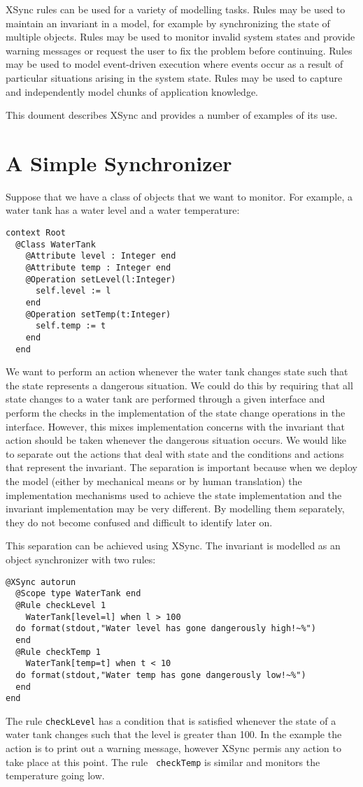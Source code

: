 \documentclass{article}
\begin{document}
XSync rules can be used for a variety of modelling tasks. Rules may be used to maintain an
invariant in a model, for example by synchronizing the state of multiple objects. Rules may be
used to monitor invalid system states and provide warning messages or request the user to
fix the problem before continuing. Rules may be used to model event-driven execution where
events occur as a result of particular situations arising in the system state. Rules may be used
to capture and independently model chunks of application knowledge.

This doument describes XSync and provides a number of examples of its use.

\section{A Simple Synchronizer}

Suppose that we have a class of objects that we want to monitor. For example, a water tank
has a water level and a water temperature:
\begin{verbatim}
context Root
  @Class WaterTank
    @Attribute level : Integer end
    @Attribute temp : Integer end
    @Operation setLevel(l:Integer)
      self.level := l
    end
    @Operation setTemp(t:Integer)
      self.temp := t
    end
  end
\end{verbatim}
We want to perform an action whenever the water tank changes state such that the state represents
a dangerous situation. We could do this by requiring that all state changes to a water tank are
performed through a given interface and perform the checks in the implementation of the
state change operations in the interface. However, this mixes implementation concerns with the
invariant that action should be taken whenever the dangerous situation occurs. We would like
to separate out the actions that deal with state and the conditions and actions that represent the
invariant. The separation is important because when we deploy the model (either by mechanical
means or by human translation) the implementation mechanisms used to achieve the state implementation
and the invariant implementation may be very different. By modelling them separately, they
do not become confused and difficult to identify later on.

This separation can be achieved using XSync. The invariant is modelled as an object synchronizer
with two rules:
\begin{verbatim}
@XSync autorun
  @Scope type WaterTank end
  @Rule checkLevel 1
    WaterTank[level=l] when l > 100
  do format(stdout,"Water level has gone dangerously high!~%")
  end
  @Rule checkTemp 1
    WaterTank[temp=t] when t < 10
  do format(stdout,"Water temp has gone dangerously low!~%")
  end
end
\end{verbatim}
The rule {\tt checkLevel} has a condition that is satisfied whenever the state of a water tank
changes such that the level is greater than 100. In the example the action is to print out a
warning message, however XSync permis any action to take place at this point. The rule {\tt 
checkTemp} is similar and monitors the temperature going low.
\end{document}
